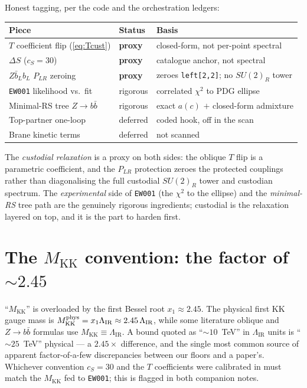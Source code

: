 \documentclass[11pt]{article}
\newcommand{\MKK}{M_{\mathrm{KK}}}
\newcommand{\LIR}{\Lambda_{\mathrm{IR}}}
\newcommand{\SUR}{SU(2)_R}
\newcommand{\PLR}{P_{LR}}
\newcommand{\code}[1]{\texttt{#1}}
\theoremstyle{definition}
\begin{document}
Honest tagging, per the code and the orchestration ledgers:
\begin{center}
\begin{tabular}{lll}
\toprule
Piece & Status & Basis \\
\midrule
$T$ coefficient flip (\eqref{eq:Tcust}) & \textbf{proxy} & closed-form, not per-point spectral \\
$\Delta S$ ($c_S=30$) & \textbf{proxy} & catalogue anchor, not spectral \\
$Z\bar b_L b_L$ $\PLR$ zeroing & \textbf{proxy} & zeroes \code{left[2,2]}; no $\SUR$ tower \\
\code{EW001} likelihood vs.\ fit & rigorous & correlated $\chi^2$ to PDG ellipse \\
Minimal-RS tree $Z\to b\bar b$ & rigorous & exact $a(c)$ $+$ closed-form admixture \\
Top-partner one-loop & deferred & coded hook, off in the scan \\
Brane kinetic terms & deferred & not scanned \\
\bottomrule
\end{tabular}
\end{center}
The \emph{custodial relaxation} is a proxy on both sides: the oblique $T$ flip is
a parametric coefficient, and the $\PLR$ protection zeroes the protected couplings
rather than diagonalising the full custodial $\SUR$ tower and custodian spectrum.
The \emph{experimental} side of \code{EW001} (the $\chi^2$ to the ellipse) and the
\emph{minimal-RS} tree path are the genuinely rigorous ingredients; custodial is
the relaxation layered on top, and it is the part to harden first.

\section{The $\MKK$ convention: the factor of $\sim 2.45$}
\label{sec:Mconvention}

``$\MKK$'' is overloaded by the first Bessel root $x_1\approx 2.45$. The physical
first KK gauge mass is $\MKK^{\rm phys} = x_1\LIR \approx 2.45\,\LIR$, while some
literature oblique and $Z\to b\bar b$ formulas use $\MKK\equiv\LIR$. A bound
quoted as ``$\sim 10$~TeV'' in $\LIR$ units is ``$\sim 25$~TeV'' physical --- a
$2.45\times$ difference, and the single most common source of apparent
factor-of-a-few discrepancies between our floors and a paper's. Whichever
convention $c_S=30$ and the $T$ coefficients were calibrated in must match the
$\MKK$ fed to \code{EW001}; this is flagged in both companion notes.
\end{document}
